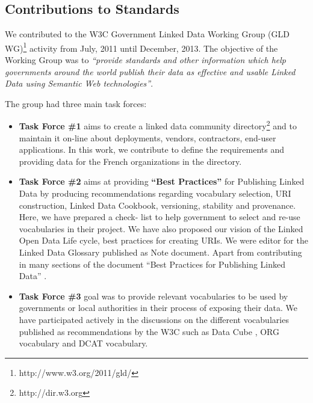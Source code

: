 \subsection{Contributions to Standards}
We contributed to the W3C Government Linked Data Working Group (GLD WG)\footnote{http://www.w3.org/2011/gld/} activity from July, 2011 until December, 2013.  The objective of the Working Group was to \textit{``provide standards and other information which help governments around the world publish their data as effective and usable Linked Data using Semantic Web technologies''}.

The group had three main task forces:
\begin{itemize}
\item \textbf{Task Force \#1} aims to create a linked data community directory\footnote{http://dir.w3.org} and to maintain it on-line about deployments, vendors, contractors, end-user applications. In this work, we contribute to define the requirements and providing data for the French organizations in the directory.

\item \textbf{Task Force \#2} aims at providing \textbf{``Best Practices''} for Publishing Linked Data by producing recommendations regarding vocabulary selection, URI construction, Linked Data Cookbook, versioning, stability and provenance. Here, we have prepared a check- list to help government to select and re-use vocabularies in their project. We have also proposed our vision of the Linked Open Data Life cycle, best practices for creating URIs. We were editor for the Linked Data Glossary \cite{glossairegld} published as Note document. Apart from contributing in many sections of the document ``Best Practices for Publishing Linked Data'' \cite{bpgld}.

\item \textbf{Task Force \#3} goal was to provide relevant vocabularies to be used by governments or local authorities in their process of exposing their data. We have participated actively in the discussions on the different vocabularies published as recommendations by the W3C such as Data Cube \cite{dcube}, ORG vocabulary \cite{org} and DCAT \cite{dcat} vocabulary.
\end{itemize}

